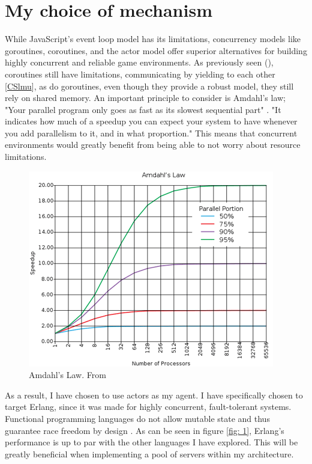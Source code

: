 \documentclass[]{final}
\begin{document}
\section{My choice of mechanism}
While JavaScript’s event loop model has its limitations, concurrency
models like goroutines, coroutines, and the actor model offer superior
alternatives for building highly concurrent and reliable game environments.
As previously seen {\hypersetup{linkcolor=teal}(\pageref{coroutines})}, coroutines still have limitations, communicating by yielding
to each other [\href{https://cs.lmu.edu/~ray/notes/introconcurrency/}{CSlmu}], as do goroutines,
even though they provide a robust model, they still rely on shared memory.
An important principle to consider is Amdahl's law; "Your parallel program only goes as fast as its slowest sequential part" \cite{yang_c_nodate}.
"It indicates how much of a speedup you can expect your system to have whenever
you add parallelism to it, and in what proportion." \cite{yang_c_nodate}
This means that concurrent environments would greatly benefit from being able to
not worry about resource limitations.
\begin{figure}[ht!]
  \centering
  \includegraphics[width=0.7\linewidth]{amdahl}
  \vspace*{-0.3cm}
  \caption{Amdahl's Law. From \cite{noauthor_hitchhikers_nodate}}
  \label{fig: 0}
\end{figure}

\newpage

As a result, I have chosen to use actors as my agent. I have specifically
chosen to target Erlang, since it was made for highly concurrent, fault-tolerant
systems. Functional programming languages do not allow mutable state and thus
guarantee race freedom by design \cite{bianchi_survey_2018}.
As can be seen in figure \ref{fig: 1}, Erlang's performance is up to par with the
other languages I have explored. This will be greatly beneficial when implementing
a pool of servers within my architecture.
\end{document}
